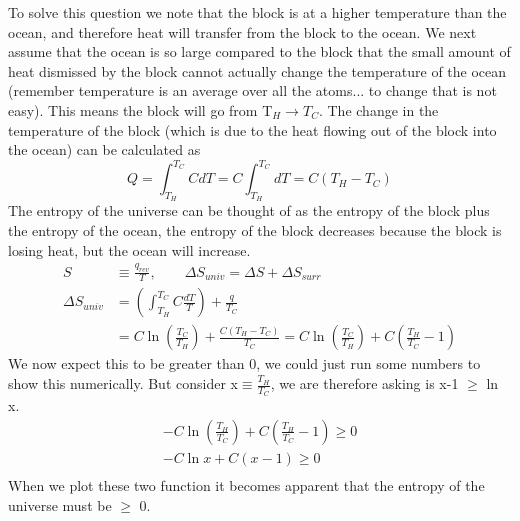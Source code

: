 \documentclass{article}
\begin{document}
To solve this question we note that the block is at a higher temperature than the ocean, and therefore heat will transfer from the block to the ocean. 
We next assume that the ocean is so large compared to the block that the small amount of heat dismissed by the block cannot actually change the temperature of the ocean (remember temperature is an average over all the atoms... to change that is not easy).
This means the block will go from T$_H \rightarrow T_C$. 
The change in the temperature of the block (which is due to the heat flowing out of the block into the ocean) can be calculated as 
\begin{equation}
   Q = \int_{T_H}^{T_C}CdT = C \int_{T_H}^{T_C}dT = C(T_H-T_C)
\end{equation}
The entropy of the universe can be thought of as the entropy of the block plus the entropy of the ocean, the entropy of the block decreases because the block is losing heat, but the ocean will increase. 
\begin{equation}
   \begin{split}
       S &\equiv \frac{q_{rev}}{T}, \qquad \Delta S_{univ} = \Delta S + \Delta S_{surr} \\
       \Delta S_{univ} &= \left(\int_{T_H}^{T_C} C \frac{dT}{T}\right) + \frac{q}{T_C} \\
       &= C\ln\left(\frac{T_C}{T_H}\right) + \frac{C(T_H-T_C)}{T_C} = C\ln\left(\frac{T_C}{T_H}\right) + C\left(\frac{T_H}{T_C}- 1\right)
   \end{split}
\end{equation}
We now expect this to be greater than 0, we could just run some numbers to show this numerically. 
But consider x$\equiv \frac{T_H}{T_C}$, we are therefore asking is x-1 $\geq$ ln x. 
\begin{equation}
\begin{split}
    -C\ln\left(\frac{T_H}{T_C}\right) + C\left(\frac{T_H}{T_C}- 1\right) \geq 0\\
      -C\ln x + C\left(x- 1\right) \geq 0\\
\end{split}
\end{equation}
When we plot these two function it becomes apparent that the entropy of the universe must be $\geq$ 0.
\end{document}
